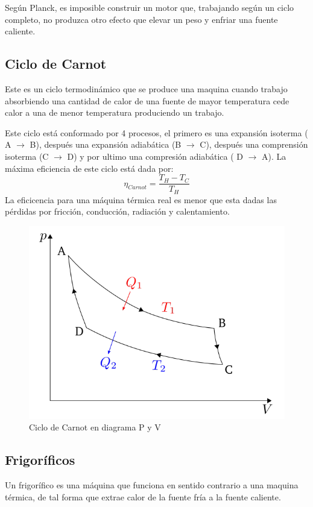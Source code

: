 Según Planck, es imposible construir un motor que, trabajando según un ciclo completo, no produzca otro efecto que elevar un peso y enfriar una fuente caliente.

\subsection{Ciclo de Carnot}
Este es un ciclo termodinámico que se produce una maquina cuando trabajo absorbiendo una cantidad de calor de una fuente de mayor temperatura cede calor a una de menor temperatura produciendo un trabajo. 

Este ciclo está conformado por 4 procesos, el primero es una expansión isoterma ( A $\rightarrow$ B), después una expansión adiabática (B $\rightarrow$ C), después una comprensión isoterma (C $\rightarrow$ D) y por ultimo una compresión adiabática ( D $\rightarrow$ A). La máxima eﬁciencia de este ciclo está dada por:
\begin{equation}
    \eta_{Carnot}=\frac{T_H-T_C}{T_H}
\end{equation}
La eficicencia para una máquina térmica real es menor que esta dadas las pérdidas por fricción, conducción, radiación y calentamiento.
\begin{figure}[H]
    \centering
    \includegraphics[scale=0.6]{img/carnot.png}
    \caption{Ciclo de Carnot en diagrama P y V}
    \label{fig:my_label}
\end{figure}

\subsection{Frigoríficos}
Un frigoríﬁco es una máquina que funciona en sentido contrario a una maquina térmica, de tal forma que extrae calor de la fuente fría a la fuente caliente.

